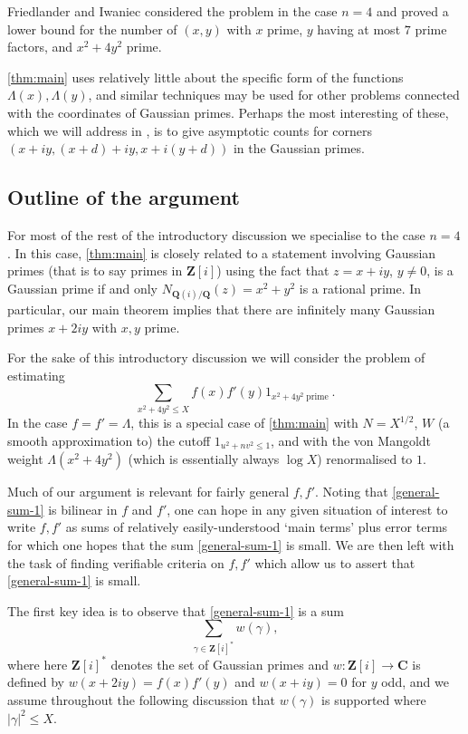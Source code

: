 \documentclass[11pt,reqno]{amsart}
\numberwithin{equation}{section}
\theoremstyle{definition}
\theoremstyle{remark}
\renewcommand{\le}{\leqslant}
\newcommand\Z{\mathbf{Z}}
\newcommand\Q{\mathbf{Q}}
\newcommand\C{\mathbf{C}}
\begin{document}
Friedlander and Iwaniec \cite{FI22} considered the problem in the case $n = 4$ and proved a lower bound for the number of $(x,y)$ with $x$ prime, $y$ having at most $7$ prime factors, and $x^2 + 4y^2$ prime. 

\cref{thm:main} uses relatively little about the specific form of the functions $\Lambda(x),\Lambda(y)$, and similar techniques may be used for other problems connected with the coordinates of Gaussian primes. Perhaps the most interesting of these, which we will address in \cite{GS24}, is to give asymptotic counts for corners $(x + iy, (x+d) + iy, x + i(y + d))$ in the Gaussian primes. 

\subsection{Outline of the argument}\label{subsec:outline}

For most of the rest of the introductory discussion we specialise to the case $n = 4$. In this case, \cref{thm:main} is closely related to a statement involving Gaussian primes (that is to say primes in $\Z[i]$) using the fact that $z = x + iy$, $y \neq 0$, is a Gaussian prime if and only $N_{\Q(i)/\Q}(z) = x^2 + y^2$ is a rational prime. In particular, our main theorem implies that there are infinitely many Gaussian primes $x + 2iy$ with $x, y$ prime.

For the sake of this introductory discussion we will consider the problem of estimating
\begin{equation}\label{general-sum-1} \sum_{x^2 + 4y^2 \le X} f(x) f'(y) 1_{x^2 + 4y^2 \operatorname{prime}}.\end{equation} In the case $f= f'= \Lambda$, this is a special case of \cref{thm:main} with $N = X^{1/2}$, $W$ (a smooth approximation to) the cutoff $1_{u^2 + nv^2 \le 1}$, and with the von Mangoldt weight $\Lambda(x^2 + 4y^2)$ (which is essentially always $\log X$) renormalised to $1$. 

Much of our argument is relevant for fairly general $f,f'$. Noting that \cref{general-sum-1} is bilinear in $f$ and $f'$, one can hope in any given situation of interest to write $f,f'$ as sums of relatively easily-understood `main terms' plus error terms for which one hopes that the sum \cref{general-sum-1} is small. We are then left with the task of finding verifiable criteria on $f,f'$ which allow us to assert that \eqref{general-sum-1} is small.

The first key idea is to observe that \cref{general-sum-1} is a sum
\begin{equation}\label{general-sum-2} \sum_{\gamma \in \Z[i]^*} w(\gamma),\end{equation} where here $\Z[i]^*$ denotes the set of Gaussian primes and $w : \Z[i] \rightarrow \C$  is defined by $w(x + 2iy) = f(x) f'(y)$ and $w(x + iy) = 0$ for $y$ odd, and we assume throughout the following discussion that $w(\gamma)$ is supported where $|\gamma|^2 \le X$.
\end{document}
